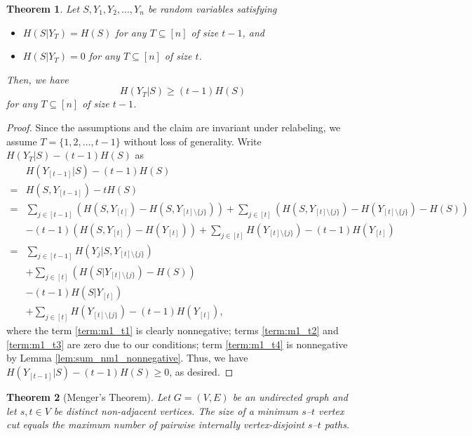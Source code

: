 \documentclass[11pt]{article}
\newtheorem{theorem}{Theorem}
\newcommand{\cond}{|}
\begin{document}
\begin{theorem}
\label{thm:master_m1}
Let $S, Y_1, Y_2, \ldots, Y_n$ be random variables satisfying
 \begin{itemize}
 	\item $H(S \cond Y_T) = H(S)$ for any $T \subseteq [n]$ of size $t-1$, and
 	\item $H(S \cond Y_T) = 0$ for any $T \subseteq [n]$ of size $t$.
 \end{itemize}
Then, we have
\[
H(Y_T \cond S) \ge (t-1)H(S)
\]
for any $T \subseteq [n]$ of size $t-1$.
\end{theorem}
\begin{proof}
Since the assumptions and the claim are invariant under relabeling, we assume $T = \{1,2,\ldots,t-1\}$ without loss of generality. Write $H(Y_T \cond S) - (t-1) H(S)$ as
\begin{align}
 & H(Y_{[t-1]} \cond S) - (t-1) H(S) \nonumber \\
 = & H(S, Y_{[t-1]}) - t H(S) \nonumber \\
 = & \sum_{j \in [t-1]} \left( H(S, Y_{[t]}) - H(S, Y_{[t] \setminus \{j\}}) \right)
  + \sum_{j \in [t]} \left( H(S, Y_{[t]\setminus\{j\}}) - H(Y_{[t]\setminus\{j\}}) - H(S) \right) \nonumber \\
 & - (t-1) \left( H(S, Y_{[t]}) - H(Y_{[t]}) \right)  + \sum_{j \in [t]} H(Y_{[t] \setminus \{j\}}) - (t-1) H(Y_{[t]}) \nonumber \\
 = & \sum_{j \in [t-1]} H(Y_j \cond S, Y_{[t] \setminus \{j\}}) \label{term:m1_t1} \\
 & + \sum_{j \in [t]} \left( H(S \cond Y_{[t]\setminus\{j\}}) - H(S) \right) \label{term:m1_t2} \\
 & - (t-1) H(S \cond Y_{[t]}) \label{term:m1_t3} \\
 & + \sum_{j \in [t]} H(Y_{[t] \setminus \{j\}}) - (t-1) H(Y_{[t]}) \label{term:m1_t4},
\end{align}
where the term \eqref{term:m1_t1} is clearly nonnegative; terms \eqref{term:m1_t2} and \eqref{term:m1_t3} are zero due to our conditions; term \eqref{term:m1_t4} is nonnegative by Lemma \ref{lem:sum_nm1_nonnegative}. Thus, we have $H(Y_{[t-1]} \cond S) - (t-1) H(S) \ge 0$, as desired.
\end{proof}

\begin{theorem}[Menger's Theorem]
Let $G=(V,E)$ be an undirected graph and let $s,t \in V$ be distinct non-adjacent vertices.
The size of a minimum $s$--$t$ vertex cut equals the maximum number of pairwise
internally vertex-disjoint $s$--$t$ paths.
\end{theorem}
\end{document}
